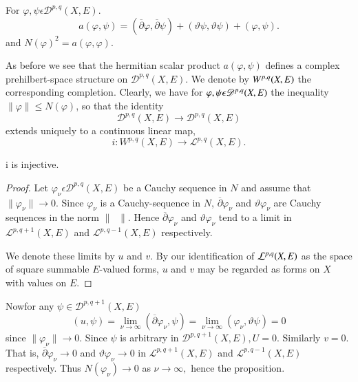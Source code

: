 \begin{definition}%
  For $ \varphi,\psi \epsilon \mathscr{D}^{p,q}(X,E)$. 
$$
a (\varphi, \psi) = (\overline{\partial} \varphi , \overline {\partial} \psi) +
  (\vartheta \psi , \vartheta \psi) + ( \varphi, \psi).
$$
 and \; $N  (\varphi)^{2} = a( \varphi, \varphi)$.  
 
 As before we see that the hermitian scalar product  $a(\varphi ,
 \psi)$ defines a complex prehilbert-space structure on
 $\mathscr{D}^{p,q}(X,E)$.  We denote by $W^{p,q}\break (X,E)$ the
 corresponding completion. Clearly, we have for $\varphi , \psi
 \epsilon \mathscr{D}^{p,q}\break(X,E)$  the  inequality $\| \varphi
 \| \leq N(\varphi)$, so that the identity   
 $$ 
 \mathscr{D}^{p,q}(X,E)\rightarrow \mathscr{D}^{p,q}(X,E) 
 $$ 
 extends uniquely to a continuous linear map, 
 $$ 
 i : W^{p,q}(X,E) \rightarrow \mathcal{L}^{p,q}(X,E).  
 $$
\end{definition}

 \begin{prop}\label{chap1:prop1.1}%
   i is injective.
 \end{prop}
 
\begin{proof}
  Let $ \varphi_{\nu} \epsilon \mathscr{D}^{p,q}(X,E)$ be a Cauchy
  sequence in $N$ and assume that $\| \varphi_\nu \| \rightarrow 0$.
  Since $ \varphi_{\nu} $ is a Cauchy-sequence in $N$, $
  \overline{\partial} \varphi_{\nu}$ and $ \vartheta \varphi_{\nu}$
  are Cauchy sequences in the norm $\| \;\;  \|$. Hence
  $\overline{\partial} \varphi_{\nu}$ and $\vartheta \varphi_{\nu}$
  tend to a limit in $\mathcal{L}^{p,q+1}(X,E)$ and
  $\mathcal{L}^{p,q-1}(X,E)$ respectively.   

  We denote these limits by $u$ and $v$. By our identification of $
  \mathcal{L}^{p,q}\break(X,E)$ as the space of square summable $E$-valued
  forms, $u$ and $v$ may be regarded as forms on $X$ with values on $E$. 
\end{proof}

 Now\pageoriginale for any $ \psi \in \mathscr{D}^{p, q+1} (X, E)$
$$
 (u, \psi)
 =\underset{  \nu \to \infty }{\lim} (\overline \partial \varphi_\nu ,
 \psi) = \underset{  \nu \to \infty }{\lim} (\varphi_\nu , \vartheta
 \psi) = 0 
$$
since $\| \varphi_\nu \| \rightarrow 0$. Since $\psi$ is
 arbitrary in $\mathscr{D}^{p, q + 1} (X , E), U=0$. Similarly
 $v=0$. That is, $\overline \partial \varphi_\nu \rightarrow 0$ and $
 \vartheta \varphi_\nu \rightarrow 0 $ in $\mathcal{L}^{p, q+1} (X,
 E)$ and $\mathcal{L}^{p, q-1} (X, E)$ respectively. Thus
 $N(\varphi_\nu) \longrightarrow 0$ as $\nu \longrightarrow \infty,$
 hence the proposition. 
 
